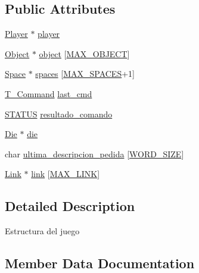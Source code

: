 \subsection*{Public Attributes}
\begin{DoxyCompactItemize}
\item 
\hyperlink{player_8h_af30e2030635a69690f85e48bc6ef202f}{Player} $\ast$ \hyperlink{struct__Game_a31406605782d71ec00c4bf258ea76267}{player}
\item 
\hyperlink{object_8h_a7f8bbcda919b65ce67f92fba08e0212f}{Object} $\ast$ \hyperlink{struct__Game_a8ade6d831e4710c40b0d61004bbd1585}{object} \mbox{[}\hyperlink{game_8h_a7083b26c57d956d72197b9428d8e4894}{M\+A\+X\+\_\+\+O\+B\+J\+E\+CT}\mbox{]}
\item 
\hyperlink{space_8h_a67533ffc2b70463baecc38fb0629bbfc}{Space} $\ast$ \hyperlink{struct__Game_ab4180417d9148f8abb2233ca6c4ecfe5}{spaces} \mbox{[}\hyperlink{space_8h_a5f54fd55f983a2e33ce076cd9f587e82}{M\+A\+X\+\_\+\+S\+P\+A\+C\+ES}+1\mbox{]}
\item 
\hyperlink{command_8h_a0473597db8c45c0289b6b8e2f8abbe32}{T\+\_\+\+Command} \hyperlink{struct__Game_a27727b50ea0904a1fe9e1c55c27f2cf1}{last\+\_\+cmd}
\item 
\hyperlink{types_8h_a32c27cc471df37f4fc818d65de0a56c4}{S\+T\+A\+T\+US} \hyperlink{struct__Game_ae5043c90b0187cdcef87720f6cdef4ce}{resultado\+\_\+comando}
\item 
\hyperlink{die_8h_a892f0b0bf81d69a1f7a14ea238e36dd3}{Die} $\ast$ \hyperlink{struct__Game_a0d6009b5dcb080489c192a9198fa7d46}{die}
\item 
char \hyperlink{struct__Game_ada8be61bb88218238ba6d17918b199aa}{ultima\+\_\+descripcion\+\_\+pedida} \mbox{[}\hyperlink{types_8h_a92ed8507d1cd2331ad09275c5c4c1c89}{W\+O\+R\+D\+\_\+\+S\+I\+ZE}\mbox{]}
\item 
\hyperlink{link_8h_ae3b299941e67be6971bfd64a25505eff}{Link} $\ast$ \hyperlink{struct__Game_acde062499c7180ecaf3bd36ba64385c6}{link} \mbox{[}\hyperlink{game_8h_abfa744c8ca5b46f7f2a10aea53a4ec59}{M\+A\+X\+\_\+\+L\+I\+NK}\mbox{]}
\end{DoxyCompactItemize}


\subsection{Detailed Description}
Estructura del juego 

\subsection{Member Data Documentation}
\mbox{\label{struct__Game_a0d6009b5dcb080489c192a9198fa7d46}} 
